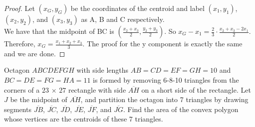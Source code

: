 \documentclass[11pt]{scrartcl}
\theoremstyle{plain}
\begin{document}
    
    \begin{proof}
        Let $(x_G,y_G)$ be the coordinates of the centroid and label $(x_1,y_1)$,$(x_2,y_2)$, and $(x_3,y_3)$ as A, B and C respectively.
        \\We have that the midpoint of BC is $\left(\frac{x_2+x_3}{2},\frac{y_2+y_3}{2}\right)$. So $x_G-x_1=\frac{2}{3}\cdot\frac{x_2+x_3-2x_1}{2}$.
        Therefore, $x_G = \frac{x_1+x_2+x_3}{3}$. The proof for the y component is exactly the same and we are done.
         
    \end{proof}
    \begin{exercise}[AIME 2018]
        Octagon $ABCDEFGH$ with side lengths $AB = CD = EF = GH = 10$ and $BC = DE = FG = HA = 11$ is formed by removing 6-8-10 triangles from the corners of a $23$ $\times$ $27$ rectangle with side $\overline{AH}$ on a short side of the rectangle. Let $J$ be the midpoint of $\overline{AH}$, and partition the octagon into 7 triangles by drawing segments $\overline{JB}$, $\overline{JC}$, $\overline{JD}$, $\overline{JE}$, $\overline{JF}$, and $\overline{JG}$. Find the area of the convex polygon whose vertices are the centroids of these 7 triangles.
    \end{exercise}
\end{document}
